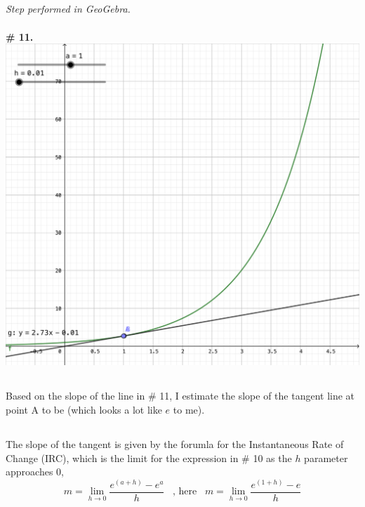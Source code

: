 \documentclass{article}
\begin{document}
\subsection{}
\emph{Step performed in GeoGebra.}
\\
\\
\textbf{\# 11.} \\
\includegraphics[width=\textwidth]{cl4-11}

\subsection{}
Based on the slope of the line in \# 11, I estimate the slope of the tangent line at point A to be  (which looks a lot like $e$ to me).

\subsection{}
The slope of the tangent is given by the forumla for the Instantaneous Rate of Change (IRC), which is the limit for the expression in \# 10 as the $h$ parameter approaches 0,
$$
m = \lim_{h \rightarrow 0} \frac{e^{(a+h)}-e^{a}}{h} \hspace{6pt}\text{ , here  }\hspace{6pt} m = \lim_{h \rightarrow 0} \frac{e^{(1+h)}-e}{h}
$$
\end{document}
